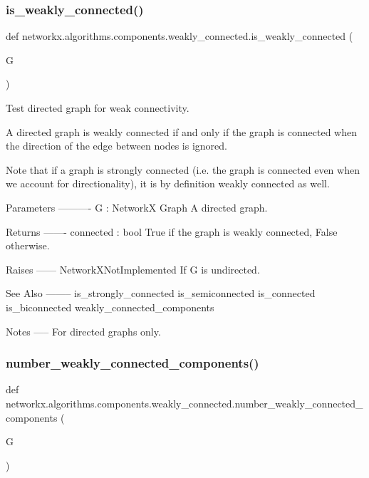 \subsubsection{\texorpdfstring{is\+\_\+weakly\+\_\+connected()}{is\_weakly\_connected()}}
{\footnotesize\ttfamily def networkx.\+algorithms.\+components.\+weakly\+\_\+connected.\+is\+\_\+weakly\+\_\+connected (\begin{DoxyParamCaption}\item[{}]{G }\end{DoxyParamCaption})}

\begin{DoxyVerb}Test directed graph for weak connectivity.

A directed graph is weakly connected if and only if the graph
is connected when the direction of the edge between nodes is ignored.

Note that if a graph is strongly connected (i.e. the graph is connected
even when we account for directionality), it is by definition weakly
connected as well.

Parameters
----------
G : NetworkX Graph
    A directed graph.

Returns
-------
connected : bool
    True if the graph is weakly connected, False otherwise.

Raises
------
NetworkXNotImplemented
    If G is undirected.

See Also
--------
is_strongly_connected
is_semiconnected
is_connected
is_biconnected
weakly_connected_components

Notes
-----
For directed graphs only.\end{DoxyVerb}
 \mbox{\label{namespacenetworkx_1_1algorithms_1_1components_1_1weakly__connected_a3594af7b5d81172279c1e0d628bd15b5}} 
\subsubsection{\texorpdfstring{number\+\_\+weakly\+\_\+connected\+\_\+components()}{number\_weakly\_connected\_components()}}
{\footnotesize\ttfamily def networkx.\+algorithms.\+components.\+weakly\+\_\+connected.\+number\+\_\+weakly\+\_\+connected\+\_\+components (\begin{DoxyParamCaption}\item[{}]{G }\end{DoxyParamCaption})}

